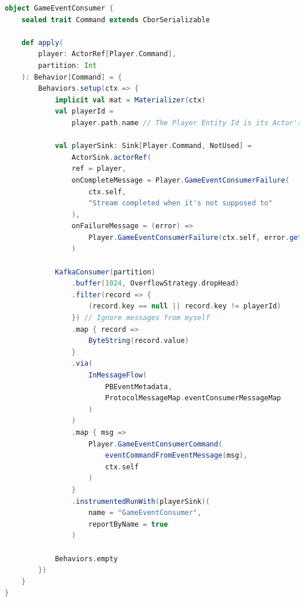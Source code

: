 \begin{lstlisting}[language=Scala, caption={\textbf{Implementación del actor GameEventConsumer}}]
object GameEventConsumer {
    sealed trait Command extends CborSerializable
    
    def apply(
        player: ActorRef[Player.Command],
        partition: Int
    ): Behavior[Command] = {
        Behaviors.setup(ctx => {
            implicit val mat = Materializer(ctx)
            val playerId =
                player.path.name // The Player Entity Id is its Actor's name
        
            val playerSink: Sink[Player.Command, NotUsed] =
                ActorSink.actorRef(
                ref = player,
                onCompleteMessage = Player.GameEventConsumerFailure(
                    ctx.self,
                    "Stream completed when it's not supposed to"
                ),
                onFailureMessage = (error) =>
                    Player.GameEventConsumerFailure(ctx.self, error.getMessage())
                )
        
            KafkaConsumer(partition)
                .buffer(1024, OverflowStrategy.dropHead)
                .filter(record => {
                    (record.key == null || record.key != playerId)
                }) // Ignore messages from myself
                .map { record =>
                    ByteString(record.value)
                }
                .via(
                    InMessageFlow(
                        PBEventMetadata,
                        ProtocolMessageMap.eventConsumerMessageMap
                    )
                )
                .map { msg =>
                    Player.GameEventConsumerCommand(
                        eventCommandFromEventMessage(msg),
                        ctx.self
                    )
                }
                .instrumentedRunWith(playerSink)(
                    name = "GameEventConsumer",
                    reportByName = true
                )
        
            Behaviors.empty
        })
    }
}
\end{lstlisting}


